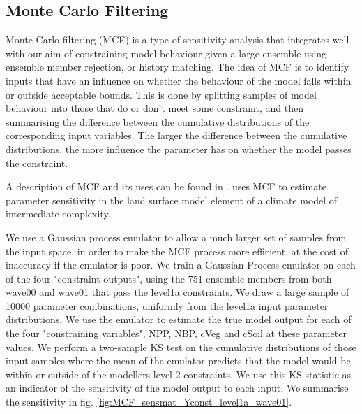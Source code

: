 \documentclass[gmd, manuscript]{copernicus}
\begin{document}
\subsection{Monte Carlo Filtering}\label{ssec:sa_MCF}

Monte Carlo filtering (MCF) is a type of sensitivity analysis that integrates well with our aim of constraining model behaviour given a large ensemble using ensemble member rejection, or history matching. The idea of MCF is to identify inputs that have an influence on whether the behaviour of the model falls within or outside acceptable bounds. This is done by splitting samples of model behaviour into those that do or don't meet some constraint, and then summarising the difference between the cumulative distributions of the corresponding input variables. The larger the difference between the cumulative distributions, the more influence the parameter has on whether the model passes the constraint.

A description of MCF and its uses can be found in \cite{pianosi2016sensitivity}. \cite{mcneall2020correcting} uses MCF to estimate parameter sensitivity in the land surface model element of a climate model of intermediate complexity.

We use a Gaussian process emulator to allow a much larger set of samples from the input space, in order to make the MCF process more efficient, at the cost of inaccuracy if the emulator is poor. We train a Gaussian Process emulator on each of the four "constraint outputs", using the 751 ensemble members from both wave00 and wave01 that pass the level1a constraints. We draw a large sample of 10000 parameter combinations, uniformly from the level1a input parameter distributions. We use the emulator to estimate the true model output for each of the four "constraining variables", NPP, NBP, cVeg and cSoil at these parameter values. We perform a two-sample KS test on the cumulative distributions of those input samples where the mean of the emulator predicts that the model would be within or outside of the modellers level 2 constraints. We use this KS statistic as an indicator of the sensitivity of the model output to each input. We summarise the sensitivity in fig. \ref{fig:MCF_sensmat_Yconst_level1a_wave01}.
\end{document}
